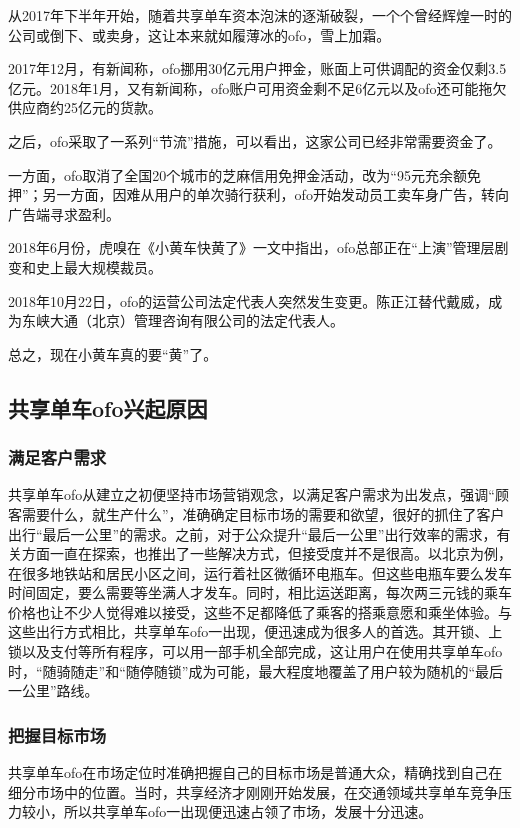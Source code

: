 \documentclass[a4paper,oneside,12pt]{article}
\begin{document}
从2017年下半年开始，随着共享单车资本泡沫的逐渐破裂，一个个曾经辉煌一时的公司或倒下、或卖身，这让本来就如履薄冰的ofo，雪上加霜。

2017年12月，有新闻称，ofo挪用30亿元用户押金，账面上可供调配的资金仅剩3.5亿元。2018年1月，又有新闻称，ofo账户可用资金剩不足6亿元以及ofo还可能拖欠供应商约25亿元的货款。

之后，ofo采取了一系列“节流”措施，可以看出，这家公司已经非常需要资金了。

一方面，ofo取消了全国20个城市的芝麻信用免押金活动，改为“95元充余额免押”；另一方面，因难从用户的单次骑行获利，ofo开始发动员工卖车身广告，转向广告端寻求盈利。

2018年6月份，虎嗅在《小黄车快黄了》一文中指出，ofo总部正在“上演”管理层剧变和史上最大规模裁员。

2018年10月22日，ofo的运营公司法定代表人突然发生变更。陈正江替代戴威，成为东峡大通（北京）管理咨询有限公司的法定代表人。

总之，现在小黄车真的要“黄”了。

\subsection{共享单车ofo兴起原因}

\subsubsection{满足客户需求}

共享单车ofo从建立之初便坚持市场营销观念，以满足客户需求为出发点，强调“顾客需要什么，就生产什么”，准确确定目标市场的需要和欲望，很好的抓住了客户出行“最后一公里”的需求。之前，对于公众提升“最后一公里”出行效率的需求，有关方面一直在探索，也推出了一些解决方式，但接受度并不是很高。以北京为例，在很多地铁站和居民小区之间，运行着社区微循环电瓶车。但这些电瓶车要么发车时间固定，要么需要等坐满人才发车。同时，相比运送距离，每次两三元钱的乘车价格也让不少人觉得难以接受，这些不足都降低了乘客的搭乘意愿和乘坐体验。与这些出行方式相比，共享单车ofo一出现，便迅速成为很多人的首选。其开锁、上锁以及支付等所有程序，可以用一部手机全部完成，这让用户在使用共享单车ofo时，“随骑随走”和“随停随锁”成为可能，最大程度地覆盖了用户较为随机的“最后一公里”路线。

\subsubsection{把握目标市场}
共享单车ofo在市场定位时准确把握自己的目标市场是普通大众，精确找到自己在细分市场中的位置。当时，共享经济才刚刚开始发展，在交通领域共享单车竞争压力较小，所以共享单车ofo一出现便迅速占领了市场，发展十分迅速。
\end{document}

